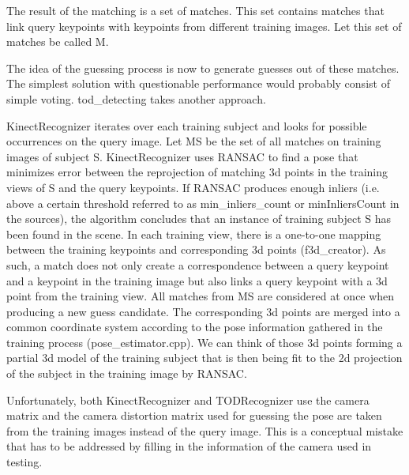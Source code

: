 The result of the matching is a set of matches. This set contains matches that
link query keypoints with keypoints from different training images. Let this
set of matches be called M.

The idea of the guessing process is now to generate guesses out of these
matches. The simplest solution with questionable performance would probably
consist of simple voting. tod\_detecting takes another approach.

KinectRecognizer iterates over each training subject and looks for possible
occurrences on the query image. Let MS  be the set of all matches on training
images of subject S. KinectRecognizer uses RANSAC to find a pose that minimizes
error between the reprojection of matching 3d points in the training views of S
and the query keypoints. If RANSAC produces enough inliers (i.e. above a
certain threshold referred to as min\_inliers\_count or minInliersCount in the
sources), the algorithm concludes that an instance of training subject S has
been found in the scene. In each training view, there is a one-to-one mapping
between the training keypoints and corresponding 3d points (f3d\_creator). As
such, a match does not only create a correspondence between a query keypoint
and a keypoint in the training image but also links a query keypoint with a 3d
point from the training view. All matches from MS are considered at once when
producing a new guess candidate. The corresponding 3d points are merged into a
common coordinate system according to the pose information gathered in the
training process (pose\_estimator.cpp). We can think of those 3d points forming
a partial 3d model of the training subject that is then being fit to the 2d
projection of the subject in the training image by RANSAC.

Unfortunately, both KinectRecognizer and TODRecognizer use the camera matrix
and the camera distortion matrix used for guessing the pose are taken from the
training images instead of the query image. This is a conceptual mistake that
has to be addressed by filling in the information of the camera used in
testing.


